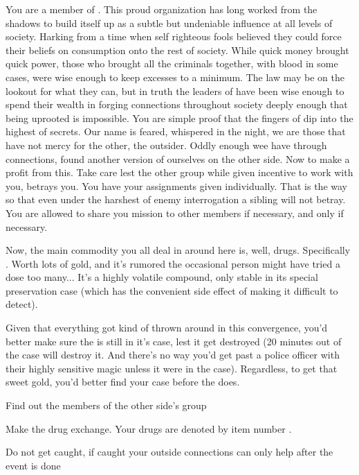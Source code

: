 \documentclass[blue]{guildcamp3}
\begin{document}
\name{\bMagicMob{}}


You are a member of \bMagicMob{}. This proud organization has long worked from the shadows to build itself up as a subtle but undeniable influence at all levels of \bMagicWorld{} society. Harking from a time when self righteous fools believed they could force their beliefs on consumption onto the rest of society. While quick money brought quick power, those who brought all the criminals together, with blood in some cases, were wise enough to keep excesses to a minimum. The law may be on the lookout for what they can, but in truth the leaders of \bMagicMob{} have been wise enough to spend their wealth in forging connections throughout society deeply enough that being uprooted is impossible. You are simple proof that the fingers of \bMagicMob{} dip into the highest of secrets. Our name is feared, whispered in the night, we are those that have not mercy for the other, the outsider. Oddly enough wee have through connections, found another version of ourselves on the other side. Now to make a profit from this. Take care lest the other group while given incentive to work with you, betrays you. You have your assignments given individually. That is the way so that even under the harshest of enemy interrogation a sibling will not betray. You are allowed to share you mission to other members if necessary, and only if necessary.

Now, the main commodity you all deal in around here is, well, drugs. Specifically \iDrugsMagic{}. Worth lots of gold, and it's rumored the occasional person might have tried a dose too many... It's a highly volatile compound, only stable in its special preservation case (which has the convenient side effect of making it difficult to detect). 

Given that everything got kind of thrown around in this convergence, you'd better make sure the \iDrugsMagic{} is still in it's case, lest it get destroyed (20 minutes out of the case will destroy it. And there's no way you'd get past a police officer with their highly sensitive magic unless it were in the case). Regardless, to get that sweet gold, you'd better find your case before the \bTechMob{} does. 

\begin{itemz}[Goals]
	\item Find out the members of the other side's group
	\item Make the drug exchange. Your drugs are denoted by item number \iDrugsMagic{}.
	\item Do not get caught, if caught your outside connections can only help after the event is done
\end{itemz}

\begin{members}
	\member{\cNobleTwo{\intro}} 
	\member{\cServant{\intro}} 
		
	\end{members}
\end{document}
